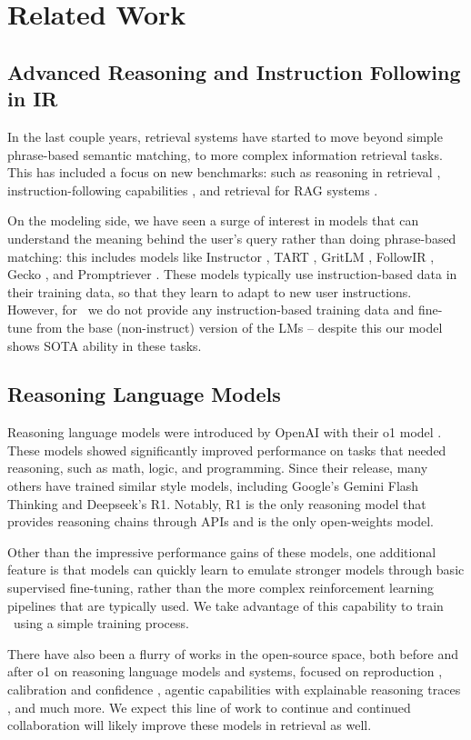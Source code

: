 \section{Related Work}
\subsection{Advanced Reasoning and Instruction Following in IR}
In the last couple years, retrieval systems have started to move beyond simple phrase-based semantic matching, to more complex information retrieval tasks. This has included a focus on new benchmarks: such as reasoning in retrieval \citep{su2024bright}, instruction-following capabilities \citep{weller2024followir,oh2024instructir}, and retrieval for RAG systems \citep{lawrie2024overview,mayfield2024evaluation}.

On the modeling side, we have seen a surge of interest in models that can understand the meaning behind the user's query rather than doing phrase-based matching: this includes models like Instructor \citep{instructor_models}, TART \citep{asai2022tart}, GritLM \citep{muennighoff2024generative}, FollowIR \citep{weller2024followir}, Gecko \citep{lee2024gecko}, and Promptriever \citep{weller2024promptriever}. These models typically use instruction-based data in their training data, so that they learn to adapt to new user instructions. However, for \modelnamepretty\ we do not provide any instruction-based training data and fine-tune from the base (non-instruct) version of the LMs -- despite this our model shows SOTA ability in these tasks.

\subsection{Reasoning Language Models}
Reasoning language models were introduced by OpenAI with their o1 model \citep{jaech2024openai}. These models showed significantly improved performance on tasks that needed reasoning, such as math, logic, and programming. Since their release, many others have trained similar style models, including Google's Gemini Flash Thinking and Deepseek's R1. Notably, R1 is the only reasoning model that provides reasoning chains through APIs and is the only open-weights model.

Other than the impressive performance gains of these models, one additional feature is that models can quickly learn to emulate stronger models through basic supervised fine-tuning, rather than the more complex reinforcement learning pipelines that are typically used. We take advantage of this capability to train \modelnamepretty\ using a simple training process.

There have also been a flurry of works in the open-source space, both before and after o1 on reasoning language models and systems, focused on reproduction \citep{snell2024scaling,muennighoff2025s1}, calibration and confidence \citep{jurayj2025your}, agentic capabilities with explainable reasoning traces \citep{weir2022nellie,weir2024enhancing}, and much more. We expect this line of work to continue and continued collaboration will likely improve these models in retrieval as well.